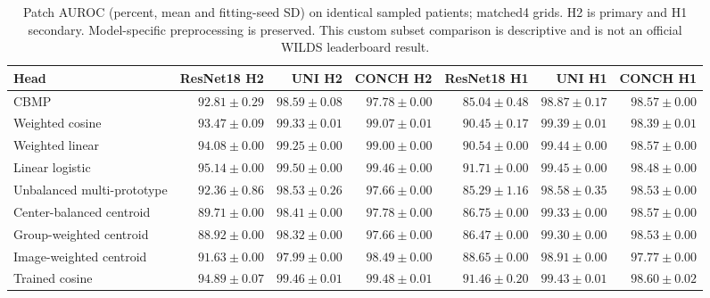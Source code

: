 \begin{table}[p]
\centering\small
\setlength{\tabcolsep}{3pt}
\begin{tabular}{lrrrrrr}
\hline
Head & ResNet18 H2 & UNI H2 & CONCH H2 & ResNet18 H1 & UNI H1 & CONCH H1 \\
\hline
CBMP & $92.81\pm0.29$ & $98.59\pm0.08$ & $97.78\pm0.00$ & $85.04\pm0.48$ & $98.87\pm0.17$ & $98.57\pm0.00$ \\
Weighted cosine & $93.47\pm0.09$ & $99.33\pm0.01$ & $99.07\pm0.01$ & $90.45\pm0.17$ & $99.39\pm0.01$ & $98.39\pm0.01$ \\
Weighted linear & $94.08\pm0.00$ & $99.25\pm0.00$ & $99.00\pm0.00$ & $90.54\pm0.00$ & $99.44\pm0.00$ & $98.57\pm0.00$ \\
Linear logistic & $95.14\pm0.00$ & $99.50\pm0.00$ & $99.46\pm0.00$ & $91.71\pm0.00$ & $99.45\pm0.00$ & $98.48\pm0.00$ \\
Unbalanced multi-prototype & $92.36\pm0.86$ & $98.53\pm0.26$ & $97.66\pm0.00$ & $85.29\pm1.16$ & $98.58\pm0.35$ & $98.53\pm0.00$ \\
Center-balanced centroid & $89.71\pm0.00$ & $98.41\pm0.00$ & $97.78\pm0.00$ & $86.75\pm0.00$ & $99.33\pm0.00$ & $98.57\pm0.00$ \\
Group-weighted centroid & $88.92\pm0.00$ & $98.32\pm0.00$ & $97.66\pm0.00$ & $86.47\pm0.00$ & $99.30\pm0.00$ & $98.53\pm0.00$ \\
Image-weighted centroid & $91.63\pm0.00$ & $97.99\pm0.00$ & $98.49\pm0.00$ & $88.65\pm0.00$ & $98.91\pm0.00$ & $97.77\pm0.00$ \\
Trained cosine & $94.89\pm0.07$ & $99.46\pm0.01$ & $99.48\pm0.01$ & $91.46\pm0.20$ & $99.43\pm0.01$ & $98.60\pm0.02$ \\
\hline
\end{tabular}
\caption{Patch AUROC (percent, mean and fitting-seed SD) on identical sampled patients; matched4 grids. H2 is primary and H1 secondary. Model-specific preprocessing is preserved. This custom subset comparison is descriptive and is not an official WILDS leaderboard result.}
\label{tab:supp_matched4_auroc}
\end{table}
